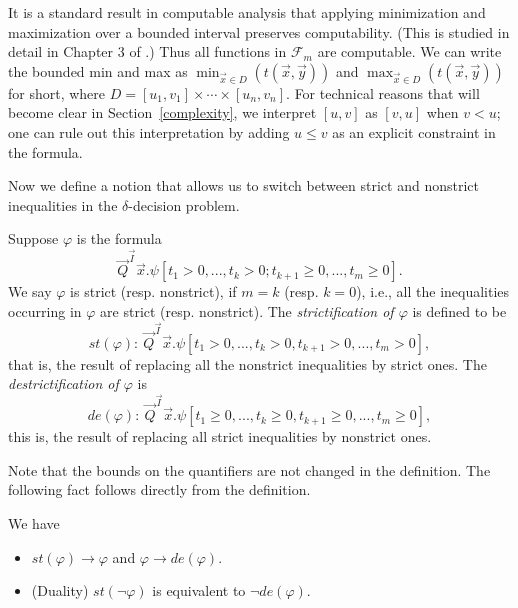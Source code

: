\documentclass[prodmode]{acmsmall} %
\begin{document}
It is a standard result in computable analysis that applying minimization and maximization over a bounded interval preserves computability. 
(This is studied in detail in Chapter 3 of \cite{Kobook}.) Thus all functions in $\mathcal{F}_{m}$ are computable. We can write the bounded min and max as $\min_{\vec x\in D}(t(\vec x, \vec y))$ and $\max_{\vec x\in D}(t(\vec x, \vec y))$ for short, where $D=[u_1,v_1]\times\cdots\times [u_n,v_n]$. For technical reasons that will become clear in Section~\ref{complexity}, we interpret $[u,v]$ as $[v,u]$ when $v < u$; one can rule out this interpretation by adding $u \leq v$ as an explicit constraint in the formula.


Now we define a notion that allows us to switch between strict and nonstrict inequalities in the $\delta$-decision problem. 

\begin{definition}[Strictification]
Suppose $\varphi$ is the formula
$$\vec Q^{\vec I}\vec x. \psi[t_1>0,...,t_k>0; t_{k+1}\geq 0,...,t_m\geq 0].$$
We say $\varphi$ is strict (resp. nonstrict), if $m=k$ (resp. $k=0$), i.e., all the inequalities occurring in $\varphi$ are strict (resp. nonstrict). The {\em strictification of $\varphi$} is defined to be 
$$\mathit{st}(\varphi):\ \vec Q^{\vec I}\vec x. \psi[t_1>0,...,t_k>0, t_{k+1}> 0,...,t_m>0],$$
that is, the result of replacing all the nonstrict inequalities by strict ones. The {\em destrictification of $\varphi$} is 
$$\mathit{de}(\varphi):\ \vec Q^{\vec I}\vec x. \psi[t_1\geq0,...,t_k\geq0, t_{k+1}\geq 0,...,t_m\geq0],$$
this is, the result of replacing all strict inequalities by nonstrict ones.
\end{definition}

Note that the bounds on the quantifiers are not changed in the definition. The following fact follows directly from the definition.  

\begin{proposition}\label{tr2}
We have 
\begin{itemize}
\item $\mathit{st}(\varphi)\rightarrow\varphi$ and $\varphi\rightarrow\mathit{de}(\varphi)$.
\item (Duality) $\mathit{st}(\neg\varphi)$ is equivalent to $\neg\mathit{de}(\varphi)$. 
\end{itemize}
\end{proposition}
\end{document}
